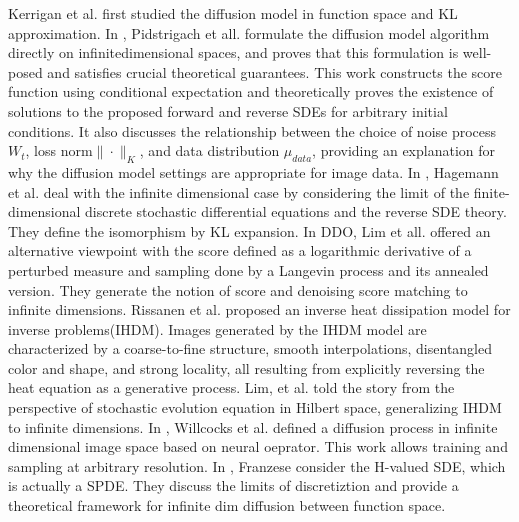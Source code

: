\documentclass{article}
\begin{document}
Kerrigan et al. \cite{kerrigan2023diffusiongenerativemodelsinfinite} first studied the diffusion model in function space and KL approximation. 
In \cite{JMLR:v25:23-1271}, Pidstrigach et all. formulate the diffusion model algorithm directly on infinitedimensional spaces, and proves that this formulation is well-posed and satisfies crucial theoretical guarantees.
This work constructs the score function using conditional expectation and theoretically proves the existence of solutions to the proposed forward and reverse SDEs for arbitrary initial conditions. 
It also discusses the relationship between the choice of noise process $W_t$, loss norm$\|\cdot\|_K$, and data distribution $\mu_{data}$, providing an explanation for why the diffusion model settings are appropriate for image data.
In \cite{hagemann2024multileveldiffusioninfinitedimensional}, Hagemann et al. deal with the infinite dimensional case by considering the limit of the finite-dimensional discrete stochastic differential equations and the reverse SDE theory.
They define the isomorphism by KL expansion.
In DDO\cite{lim2025scorebaseddiffusionmodelsfunction}, Lim et all. offered an alternative viewpoint with the score defined as a logarithmic derivative of a perturbed measure and sampling done by a Langevin process and its annealed version.
They generate the notion of score and denoising score matching to infinite dimensions.
Rissanen et al.\cite{rissanen2023generativemodellinginverseheat} proposed an inverse heat dissipation model for inverse problems(IHDM).
Images generated by the IHDM model are characterized by a coarse-to-fine structure, smooth interpolations, disentangled color and shape, and strong locality, 
all resulting from explicitly reversing the heat equation as a generative process. 
Lim, et al.\cite{NEURIPS2023_76c6f9f2} told the story from the perspective of stochastic evolution equation in Hilbert space, generalizing IHDM to infinite dimensions. 
In \cite{bond2024infty}, Willcocks et al. defined a diffusion process in infinite dimensional image space based on neural oeprator.
This work allows training and sampling at arbitrary resolution.
In \cite{franzese2023continuoustimefunctionaldiffusionprocesses}, Franzese consider the H-valued SDE, which is actually a SPDE.
They discuss the limits of discretiztion and provide a theoretical framework for infinite dim diffusion between function space.


\cite{park2025stochasticoptimalcontroldiffusion}
\cite{baker2024conditioningnonlinearinfinitedimensionaldiffusion}
\cite{yang2024simulatinginfinitedimensionalnonlineardiffusion}
\cite{na2025probabilityflowodeinfinitedimensionalfunction}
\end{document}
